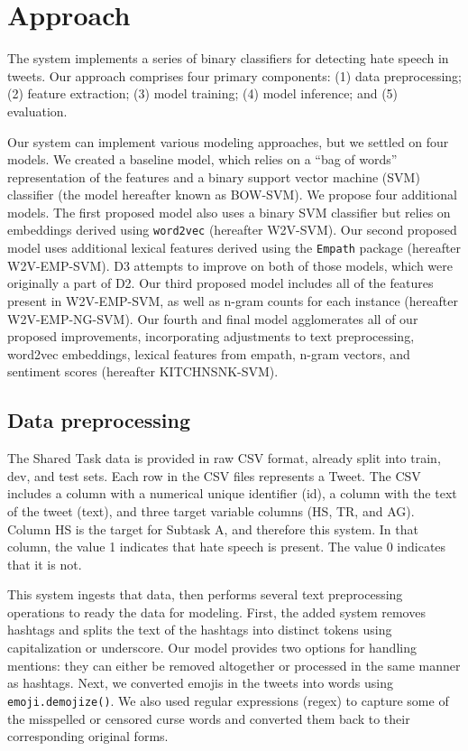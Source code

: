 \documentclass[11pt,a4paper]{article}
\begin{document}
\section{Approach}
The system implements a series of binary classifiers for detecting hate speech in tweets. Our approach comprises four primary components: (1) data preprocessing; (2) feature extraction; (3) model training; (4) model inference; and (5) evaluation.

Our system can implement various modeling approaches, but we settled on four models. We created a baseline model, which relies on a “bag of words” representation of the features and a binary support vector machine (SVM) classifier (the model hereafter known as BOW-SVM). We propose four additional models. The first proposed model also uses a binary SVM classifier but relies on embeddings derived using \verb|word2vec| (hereafter W2V-SVM). Our second proposed model uses additional lexical features derived using the \verb|Empath| package (hereafter W2V-EMP-SVM). D3 attempts to improve on both of those models, which were originally a part of D2. Our third proposed model includes all of the features present in W2V-EMP-SVM, as well as n-gram counts for each instance (hereafter W2V-EMP-NG-SVM). Our fourth and final model agglomerates all of our proposed improvements, incorporating adjustments to text preprocessing, word2vec embeddings, lexical features from empath, n-gram vectors, and sentiment scores (hereafter KITCHNSNK-SVM).


\subsection{Data preprocessing}
The Shared Task data is provided in raw CSV format, already split into train, dev, and test sets. Each row in the CSV files represents a Tweet. The CSV includes a column with a numerical unique identifier (id), a column with the text of the tweet (text), and three target variable columns (HS, TR, and AG). Column HS is the target for Subtask A, and therefore this system. In that column, the value 1 indicates that hate speech is present. The value 0 indicates that it is not.

This system ingests that data, then performs several text preprocessing operations to ready the data for modeling. First, the added system removes hashtags and splits the text of the hashtags into distinct tokens using capitalization or underscore. Our model provides two options for handling mentions: they can either be removed altogether or processed in the same manner as hashtags. Next, we converted emojis in the tweets into words using \verb|emoji.demojize()|. We also used regular expressions (regex) to capture some of the misspelled or censored curse words and converted them back to their corresponding original forms. 
\end{document}
